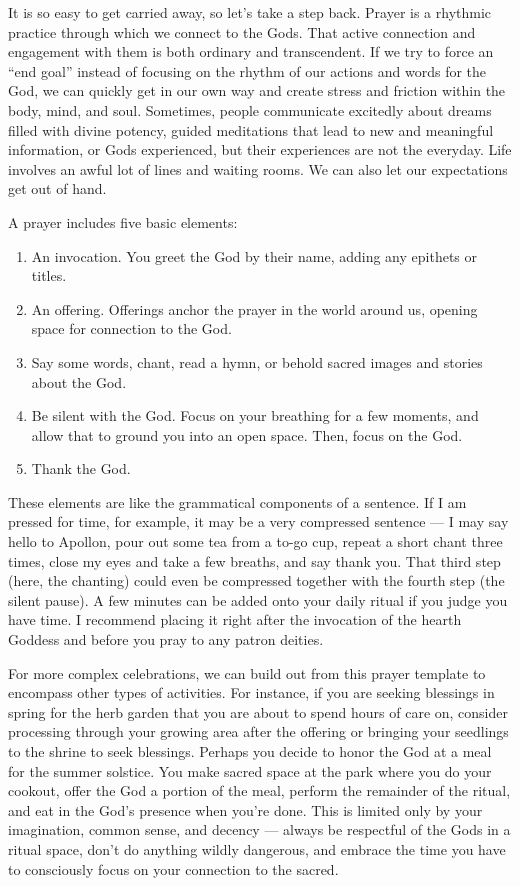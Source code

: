 \documentclass[
]{book}
\providecommand{\tightlist}{%
  \setlength{\itemsep}{0pt}\setlength{\parskip}{0pt}}
\begin{document}
It is so easy to get carried away, so let's take a step back. Prayer is a rhythmic practice through which we connect to the Gods. That active connection and engagement with them is both ordinary and transcendent. If we try to force an ``end goal'' instead of focusing on the rhythm of our actions and words for the God, we can quickly get in our own way and create stress and friction within the body, mind, and soul. Sometimes, people communicate excitedly about dreams filled with divine potency, guided meditations that lead to new and meaningful information, or Gods experienced, but their experiences are not the everyday. Life involves an awful lot of lines and waiting rooms. We can also let our expectations get out of hand.

A prayer includes five basic elements:

\begin{enumerate}
\def\labelenumi{\arabic{enumi}.}
\tightlist
\item
  An invocation. You greet the God by their name, adding any epithets or titles.
\item
  An offering. Offerings anchor the prayer in the world around us, opening space for connection to the God.
\item
  Say some words, chant, read a hymn, or behold sacred images and stories about the God.
\item
  Be silent with the God. Focus on your breathing for a few moments, and allow that to ground you into an open space. Then, focus on the God.
\item
  Thank the God.
\end{enumerate}

These elements are like the grammatical components of a sentence. If I am pressed for time, for example, it may be a very compressed sentence --- I may say hello to Apollon, pour out some tea from a to-go cup, repeat a short chant three times, close my eyes and take a few breaths, and say thank you. That third step (here, the chanting) could even be compressed together with the fourth step (the silent pause). A few minutes can be added onto your daily ritual if you judge you have time. I recommend placing it right after the invocation of the hearth Goddess and before you pray to any patron deities.

For more complex celebrations, we can build out from this prayer template to encompass other types of activities. For instance, if you are seeking blessings in spring for the herb garden that you are about to spend hours of care on, consider processing through your growing area after the offering or bringing your seedlings to the shrine to seek blessings. Perhaps you decide to honor the God at a meal for the summer solstice. You make sacred space at the park where you do your cookout, offer the God a portion of the meal, perform the remainder of the ritual, and eat in the God's presence when you're done. This is limited only by your imagination, common sense, and decency --- always be respectful of the Gods in a ritual space, don't do anything wildly dangerous, and embrace the time you have to consciously focus on your connection to the sacred.
\end{document}
